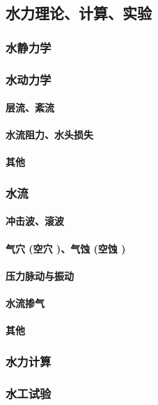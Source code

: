 \documentclass[UTF8]{../../ApplicationUniverse}
\begin{document}
    \subsection{水力理论、计算、实验}
        \subsubsection{水静力学}
        \subsubsection{水动力学}
            \paragraph{层流、紊流}
            \paragraph{水流阻力、水头损失}
            \paragraph{其他}
        \subsubsection{水流}
            \paragraph{冲击波、滚波}
            \paragraph{气穴 (空穴 )、气蚀 (空蚀 )}
            \paragraph{压力脉动与振动}
            \paragraph{水流掺气}
            \paragraph{其他}
        \subsubsection{水力计算}
        \subsubsection{水工试验}
\end{document}
